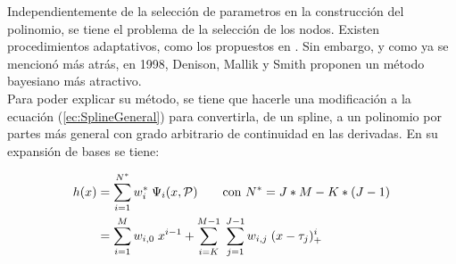 \documentclass[../Main/Main.tex]{subfiles}
\begin{document}
Independientemente de la selección de parametros en la construcción del polinomio, se tiene el problema de la selección de los nodos. Existen procedimientos adaptativos, como los propuestos en \autocite{friedman1991multivariate}. Sin embargo, y como ya se mencionó más atrás, en 1998, Denison, Mallik y Smith proponen un método bayesiano más atractivo.\\

Para poder explicar su método, se tiene que hacerle una modificación a la ecuación (\ref{ec:SplineGeneral}) para convertirla, de un spline, a un polinomio por partes más general con grado arbitrario de continuidad en las derivadas. En su expansión de bases se tiene:

\begin{align}
	h(x) &= \sum_{i = 1}^{N^*} w_i^* \; \Psi_i(x,\mathcal{P}) \qquad \text{con  } N^* = J*M - K*(J-1) \label{ec:ExpBase_wEstrella} \\ 
 		 &=	\sum_{i = 1}^M w_{i,0} \; x^{i-1} + 
			\sum_{i = K}^{M-1} \;
	 		\sum_{j = 1}^{J-1}w_{i,j}\;(x - \tau_j)_+^{i}
	 			\label{ec:PoliMallik}
\end{align}
\end{document}
